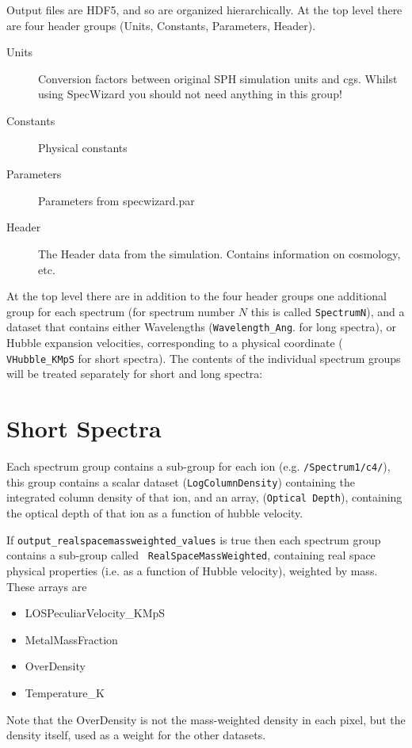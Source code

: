 \documentclass{report}
\begin{document}
Output files are HDF5, and so are organized hierarchically.  At the top level there are four header groups (Units, Constants, Parameters, Header).

\begin{description}
   \item[Units] Conversion factors between original SPH simulation units and cgs.  Whilst using SpecWizard you should not need anything in this group!
   \item[Constants] Physical constants
   \item[Parameters] Parameters from specwizard.par
   \item[Header] The Header data from the simulation.  Contains information on cosmology, etc.
\end{description}  

At the top level there are in addition to the four header groups one
additional group for each spectrum (for spectrum number $N$ this is
called {\tt SpectrumN}), and a dataset that contains either
Wavelengths ({\tt Wavelength\_Ang}. for long spectra), or Hubble
expansion velocities, corresponding to a physical coordinate ({\tt
  VHubble\_KMpS} for short spectra).  The contents of the individual
spectrum groups will be treated separately for short and long spectra:

\section{Short Spectra}

Each spectrum group contains a sub-group for each ion
(e.g. {\tt /Spectrum1/c4/}), this group contains a scalar dataset
({\tt LogColumnDensity}) containing the integrated column density of
that ion, and an array, ({\tt Optical Depth}), containing the optical
depth of that ion as a function of hubble velocity.

If {\tt output\_realspacemassweighted\_values} is true then each
spectrum group contains a sub-group called {\tt
  RealSpaceMassWeighted}, containing real space physical properties
(i.e. as a function of Hubble velocity), weighted by mass.  These
arrays are

\begin{itemize}
\item LOSPeculiarVelocity\_KMpS
\item MetalMassFraction
\item OverDensity
\item Temperature\_K
\end{itemize}
Note that the OverDensity is not the mass-weighted density in each pixel, but the density itself, used as a weight for the other datasets. 
\end{document}
